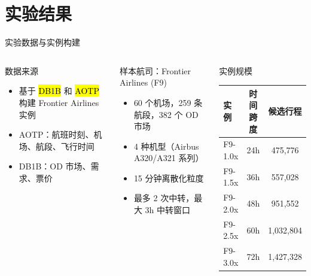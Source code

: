 \section{实验结果}

\begin{frame}{实验数据与实例构建}
\begin{columns}[T,totalwidth=\textwidth]
\begin{block}{数据来源}
\begin{itemize}
    \item 基于 \hl{DB1B} 和 \hl{AOTP} 构建 Frontier Airlines 实例
    \item AOTP：航班时刻、机场、航段、飞行时间
    \item DB1B：OD 市场、需求、票价
\end{itemize}
\end{block}

\begin{block}{样本航司：Frontier Airlines (F9)}
\begin{itemize}
    \item 60 个机场，259 条航段，382 个 OD 市场
    \item 4 种机型（Airbus A320/A321 系列）
    \item 15 分钟离散化粒度
    \item 最多 2 次中转，最大 3h 中转窗口
\end{itemize}
\end{block}

\begin{block}{实例规模}
\centering
\small
\begin{tabular}{lcc}
\toprule
实例 & 时间跨度 & 候选行程 \\
\midrule
F9-1.0x & 24h & 475,776 \\
F9-1.5x & 36h & 557,028 \\
F9-2.0x & 48h & 951,552 \\
F9-2.5x & 60h & 1,032,804 \\
F9-3.0x & 72h & 1,427,328 \\
\bottomrule
\end{tabular}
\end{block}
\end{columns}
\end{frame}


